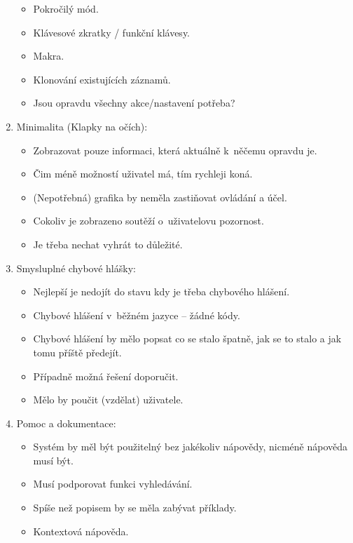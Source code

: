 \begin{enumerate}
\begin{itemize}
            \item Pokročilý mód.
            \item Klávesové zkratky / funkční klávesy.
            \item Makra.
            \item Klonování existujících záznamů.
            \item Jsou opravdu všechny akce/nastavení potřeba?
        \end{itemize}
    \item Minimalita (Klapky na očích):
        \begin{itemize}
            \item Zobrazovat pouze informaci, která aktuálně k~něčemu opravdu je.
            \item Čim méně možností uživatel má, tím rychleji koná.
            \item (Nepotřebná) grafika by neměla zastiňovat ovládání a účel.
            \item Cokoliv je zobrazeno soutěží o~uživatelovu pozornost.
            \item Je třeba nechat vyhrát to důležité.
        \end{itemize}
    \item Smysluplné chybové hlášky:
        \begin{itemize}
            \item Nejlepší je nedojít do stavu kdy je třeba chybového hlášení.
            \item Chybové hlášení v~běžném jazyce – žádné kódy.
            \item Chybové hlášení by mělo popsat co se stalo špatně, jak se to stalo a jak tomu příště předejít.
            \item Případně možná řešení doporučit.
            \item Mělo by poučit (vzdělat) uživatele.
        \end{itemize}
    \item Pomoc a dokumentace:
        \begin{itemize}
            \item Systém by měl být použitelný bez jakékoliv nápovědy, nicméně nápověda musí být.
            \item Musí podporovat funkci vyhledávání.
            \item Spíše než popisem by se měla zabývat příklady.
            \item Kontextová nápověda.
        \end{itemize}
\end{enumerate}

